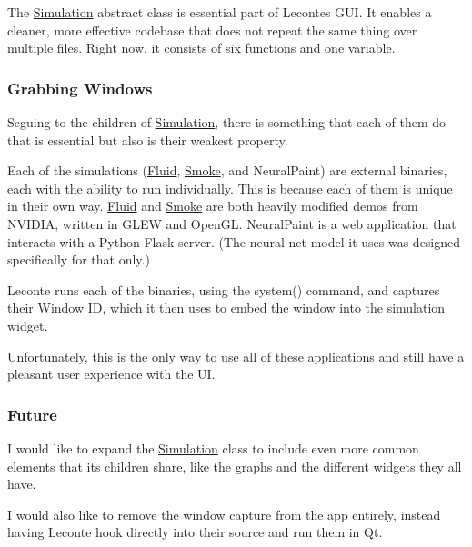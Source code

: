 The \mbox{\hyperlink{classSimulation}{Simulation}} abstract class is essential part of Leconte\textquotesingle{}s G\+UI. It enables a cleaner, more effective codebase that does not repeat the same thing over multiple files. Right now, it consists of six functions and one variable.

\subsubsection*{Grabbing Windows}

Seguing to the children of \mbox{\hyperlink{classSimulation}{Simulation}}, there is something that each of them do that is essential but also is their weakest property.

Each of the simulations (\mbox{\hyperlink{classFluid}{Fluid}}, \mbox{\hyperlink{classSmoke}{Smoke}}, and Neural\+Paint) are external binaries, each with the ability to run individually. This is because each of them is unique in their own way. \mbox{\hyperlink{classFluid}{Fluid}} and \mbox{\hyperlink{classSmoke}{Smoke}} are both heavily modified demos from N\+V\+I\+D\+IA, written in G\+L\+EW and Open\+GL. Neural\+Paint is a web application that interacts with a Python Flask server. (The neural net model it uses was designed specifically for that only.)

Leconte runs each of the binaries, using the {\ttfamily system()} command, and captures their Window ID, which it then uses to embed the window into the simulation widget.

Unfortunately, this is the only way to use all of these applications and still have a pleasant user experience with the UI.

\subsubsection*{Future}

I would like to expand the \mbox{\hyperlink{classSimulation}{Simulation}} class to include even more common elements that its children share, like the graphs and the different widgets they all have.

I would also like to remove the window capture from the app entirely, instead having Leconte hook directly into their source and run them in Qt. 